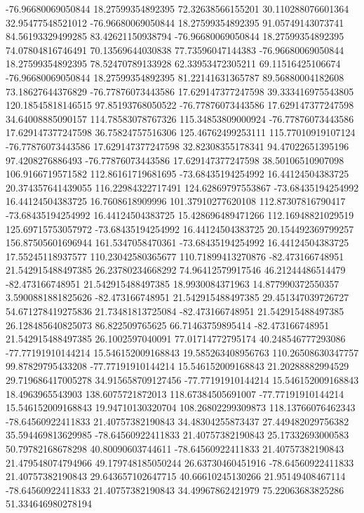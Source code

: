 -76.96680069050844 18.27599354892395 72.32638566155201 30.110288076601364 32.95477548521012
-76.96680069050844 18.27599354892395 91.05749143073741 84.56193329499285 83.42621150938794
-76.96680069050844 18.27599354892395 74.07804816746491 70.13569644030838 77.73596047144383
-76.96680069050844 18.27599354892395 78.52470789133928 62.33953472305211 69.11516425106674
-76.96680069050844 18.27599354892395 81.22141631365787 89.56880004182608 73.18627644376829
-76.77876073443586 17.629147377247598 39.333416975543805 120.18545818146515 97.85193768050522
-76.77876073443586 17.629147377247598 34.64008885090157 114.78583078767326 115.34853809000924
-76.77876073443586 17.629147377247598 36.75824757516306 125.46762499253111 115.77010919107124
-76.77876073443586 17.629147377247598 32.82308355178341 94.47022651395196 97.4208276886493
-76.77876073443586 17.629147377247598 38.50106510907098 106.9166719571582 112.86161719681695
-73.68435194254992 16.44124504383725 20.374357641439055 116.22984322717491 124.62869797553867
-73.68435194254992 16.44124504383725 16.7608618909996 101.37910277620108 112.87307816790417
-73.68435194254992 16.44124504383725 15.428696489471266 112.16948821029519 125.69715753057972
-73.68435194254992 16.44124504383725 20.154492369799257 156.87505601696944 161.5347058470361
-73.68435194254992 16.44124504383725 17.55245118937577 110.23042580365677 110.71899413270876
-82.473166748951 21.542915488497385 26.23780234668292 74.96412579917546 46.21244486514479
-82.473166748951 21.542915488497385 18.9930084371963 14.877990372550357 3.5900881881825626
-82.473166748951 21.542915488497385 29.451347039726727 54.671278419275836 21.73481813725084
-82.473166748951 21.542915488497385 26.128485640825073 86.822509765625 66.71463759895414
-82.473166748951 21.542915488497385 26.1002597040091 77.01714772795174 40.248546777293086
-77.77191910144214 15.546152009168843 19.585263408956763 110.26508630347757 99.87829795433208
-77.77191910144214 15.546152009168843 21.20288882994529 29.719686417005278 34.915658709127456
-77.77191910144214 15.546152009168843 18.4963965543903 138.6075721872013 118.67384505691007
-77.77191910144214 15.546152009168843 19.94710130320704 108.26802299309873 118.13766076462343
-78.64560922411833 21.40757382190843 34.48304255873437 27.449482029756382 35.594469813629985
-78.64560922411833 21.40757382190843 25.17332693000583 50.79782168678298 40.80090603744611
-78.64560922411833 21.40757382190843 21.479548074794966 49.179748185050244 26.63730460451916
-78.64560922411833 21.40757382190843 29.643657102647715 40.66610245130266 21.95149408467114
-78.64560922411833 21.40757382190843 34.49967862421979 75.22063683825286 51.334646980278194
